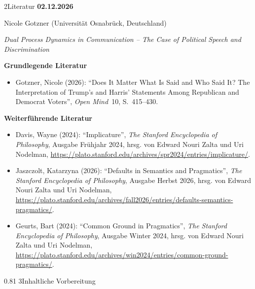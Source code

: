 \documentclass[xcolor=table,9pt,aspectratio=169]{beamer}
\begin{document}
\begin{frame}{\vspace*{10mm}2\hspace*{1em}Literatur}
\textbf{02.12.2026}

\smallskip
Nicole Gotzner (Universität Osnabrück, Deutschland)

\medskip
\textit{Dual Process Dynamics in Communication -- The Case of Political Speech and Discrimination}


\medskip
\textbf{Grundlegende Literatur}
{\footnotesize
\begin{itemize}[label=,leftmargin=2em,itemindent=-2em]
   \item Gotzner, Nicole (2026): \enquote{Does It Matter What Is Said and Who Said It? The Interpretation of Trump's and Harris' Statements Among Republican and Democrat Voters}, \textit{Open Mind}~10, S.~415--430.
\end{itemize}
}

\medskip
\textbf{Weiterführende Literatur}
{\footnotesize
\begin{itemize}[label=,leftmargin=2em,itemindent=-2em]
   \item Davis, Wayne (2024): \enquote{Implicature}, \textit{The Stanford Encyclopedia of Philosophy}, Ausgabe Frühjahr 2024, hrsg. von Edward Nouri Zalta und Uri Nodelman, \url{https://plato.stanford.edu/archives/spr2024/entries/implicature/}.
   \item Jaszczolt, Katarzyna (2026): \enquote{Defaults in Semantics and Pragmatics}, \textit{The Stanford Encyclopedia of Philosophy}, Ausgabe Herbst 2026, hrsg. von Edward Nouri Zalta und Uri Nodelman, \url{https://plato.stanford.edu/archives/fall2026/entries/defaults-semantics-pragmatics/}.
   \item Geurts, Bart (2024): \enquote{Common Ground in Pragmatics}, \textit{The Stanford Encyclopedia of Philosophy}, Ausgabe Winter 2024, hrsg. von Edward Nouri Zalta und Uri Nodelman, \url{https://plato.stanford.edu/archives/win2024/entries/common-ground-pragmatics/}.
\end{itemize}
}
\end{frame}


\begin{frame}
\begin{overlayarea}{\textwidth}{0.81\paperheight}{
   \vspace*{11mm}
   \textcolor{uolblue}
   {3\hspace*{1em}Inhaltliche Vorbereitung}
}
\end{overlayarea}
\end{frame}
\end{document}
